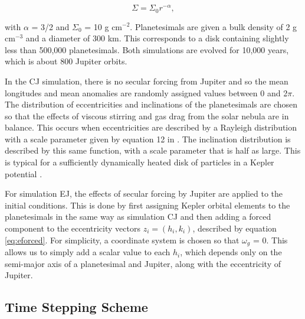 \documentclass[twocolumn]{aastex63}
\begin{document}
\begin{equation}\label{eq:surf_den}
	\Sigma = \Sigma_{0} r^{-\alpha},
\end{equation}

\noindent with $\alpha$ = 3/2 and $\Sigma_{0}$ = 10 g cm$^{-2}$. Planetesimals are given a bulk density of 2 g cm$^{-3}$ and a 
diameter of 300 km. This corresponds to a disk containing slightly less than 500,000 planetesimals. Both simulations are evolved for 
10,000 years, which is about 800 Jupiter orbits.

In the CJ simulation, there is no secular forcing from Jupiter and so the mean longitudes and mean anomalies are randomly 
assigned values between 0 and 2$\pi$. The distribution of eccentricities and inclinations of the planetesimals are chosen so that the 
effects of viscous stirring and gas drag from the solar nebula are in balance. This occurs when eccentricities are described by a 
Rayleigh distribution with a scale parameter given by equation 12 in \citet{2002ApJ...581..666K}. The inclination distribution is 
described by this same function, with a scale parameter that is half as large. This is typical for a sufficiently dynamically heated disk 
of particles in a Kepler potential \citep{1993MNRAS.263..875I}.

For simulation EJ, the effects of secular forcing by Jupiter are applied to the initial conditions. This is done by first assigning Kepler 
orbital elements to the planetesimals in the same way as simulation CJ and then adding a forced component to the eccentricity 
vectors $z_{i} = \left( h_{i}, k_{i} \right)$, described by equation \ref{eq:eforced}. For simplicity, a coordinate system is chosen so that 
$\omega_{g}$ = 0. This allows us to simply add a scalar value to each $h_{i}$, which depends only on the semi-major axis of a 
planetesimal and Jupiter, along with the eccentricity of Jupiter.

\subsection{Time Stepping Scheme}\label{sec:timestep}
\end{document}

